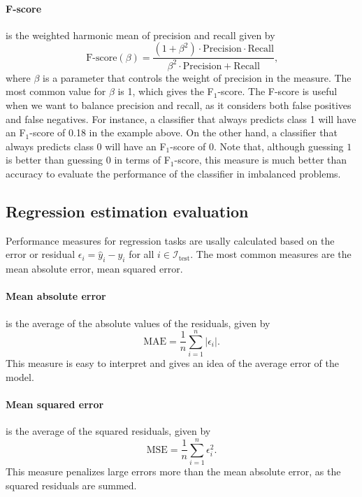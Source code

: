\paragraph{F-score} is the weighted harmonic mean of precision and recall given by
\begin{equation*}
  \text{F-score}(\beta) =
    \frac%
      {(1 + \beta^2) \cdot \text{Precision} \cdot \text{Recall}}
      {\beta^2 \cdot \text{Precision} + \text{Recall}}\text{,}
\end{equation*}
where $\beta$ is a parameter that controls the weight of precision in the measure.  The
most common value for $\beta$ is 1, which gives the F$_1$-score.  The F-score is useful
when we want to balance precision and recall, as it considers both false positives and
false negatives.  For instance, a classifier that always predicts class 1 will have an
F$_1$-score of 0.18 in the example above.  On the other hand, a classifier that always
predicts class 0 will have an F$_1$-score of 0.  Note that, although guessing $1$ is
better than guessing $0$ in terms of F$_1$-score, this measure is much better than
accuracy to evaluate the performance of the classifier in imbalanced problems.


\subsection{Regression estimation evaluation}

Performance measures for regression tasks are usally calculated based on the error or residual
$\epsilon_i = \hat{y}_i - y_i$ for all $i \in \mathcal{I}_\text{test}$.  The most common measures
are the mean absolute error, mean squared error.

\paragraph{Mean absolute error} is the average of the absolute values of the residuals,
given by
\begin{equation*}
  \text{MAE} = \frac{1}{n} \sum_{i=1}^n | \epsilon_i |\text{.}
\end{equation*}
This measure is easy to interpret and gives an idea of the average error of the model.

\paragraph{Mean squared error} is the average of the squared residuals, given by
\begin{equation*}
  \text{MSE} = \frac{1}{n} \sum_{i=1}^n \epsilon_i^2\text{.}
\end{equation*}
This measure penalizes large errors more than the mean absolute error, as the squared
residuals are summed.

